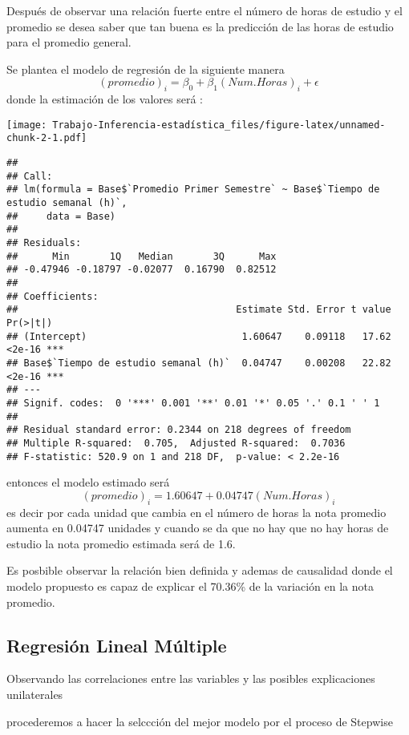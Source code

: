 \documentclass[
  man]{apa6}
\begin{document}
Después de observar una relación fuerte entre el número de horas de
estudio y el promedio se desea saber que tan buena es la predicción de
las horas de estudio para el promedio general.

Se plantea el modelo de regresión de la siguiente manera \[
(promedio)_i=\beta_0+\beta_1(Num.Horas)_i+\epsilon\] donde la estimación
de los valores será :

\texttt{[image: Trabajo-Inferencia-estadística\_files/figure-latex/unnamed-chunk-2-1.pdf]}

\begin{verbatim}
## 
## Call:
## lm(formula = Base$`Promedio Primer Semestre` ~ Base$`Tiempo de estudio semanal (h)`, 
##     data = Base)
## 
## Residuals:
##      Min       1Q   Median       3Q      Max 
## -0.47946 -0.18797 -0.02077  0.16790  0.82512 
## 
## Coefficients:
##                                      Estimate Std. Error t value Pr(>|t|)    
## (Intercept)                           1.60647    0.09118   17.62   <2e-16 ***
## Base$`Tiempo de estudio semanal (h)`  0.04747    0.00208   22.82   <2e-16 ***
## ---
## Signif. codes:  0 '***' 0.001 '**' 0.01 '*' 0.05 '.' 0.1 ' ' 1
## 
## Residual standard error: 0.2344 on 218 degrees of freedom
## Multiple R-squared:  0.705,  Adjusted R-squared:  0.7036 
## F-statistic: 520.9 on 1 and 218 DF,  p-value: < 2.2e-16
\end{verbatim}

entonces el modelo estimado será
\[ (promedio)_i=1.60647+0.04747(Num.Horas)_i\] es decir por cada unidad
que cambia en el número de horas la nota promedio aumenta en 0.04747
unidades y cuando se da que no hay que no hay horas de estudio la nota
promedio estimada será de 1.6.

Es posbible observar la relación bien definida y ademas de causalidad
donde el modelo propuesto es capaz de explicar el 70.36\% de la variación
en la nota promedio.

\newpage

\hypertarget{regresiuxf3n-lineal-muxfaltiple}{%
\subsection{Regresión Lineal Múltiple}\label{regresiuxf3n-lineal-muxfaltiple}}

Observando las correlaciones entre las variables y las posibles
explicaciones unilaterales

procederemos a hacer la selccción del mejor modelo por el proceso de
Stepwise
\end{document}
